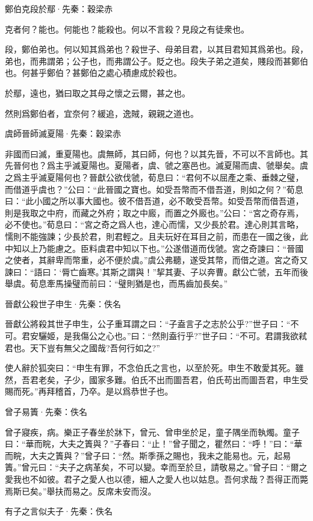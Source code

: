 \documentclass[12pt,a4paper]{ctexbook}
\begin{document}
鄭伯克段於鄢·先秦：穀梁赤 \par
克者何？能也。何能也？能殺也。何以不言殺？見段之有徒衆也。\par
段，鄭伯弟也。何以知其爲弟也？殺世子、母弟目君，以其目君知其爲弟也。段，弟也，而弗謂弟；公子也，而弗謂公子。貶之也。段失子弟之道矣，賤段而甚鄭伯也。何甚乎鄭伯？甚鄭伯之處心積慮成於殺也。\par
於鄢，遠也，猶曰取之其母之懷之云爾，甚之也。\par
然則爲鄭伯者，宜奈何？緩追，逸賊，親親之道也。\par
虞師晉師滅夏陽·先秦：穀梁赤 \par
非國而曰滅，重夏陽也。虞無師，其曰師，何也？以其先晉，不可以不言師也。其先晉何也？爲主乎滅夏陽也。夏陽者，虞、虢之塞邑也。滅夏陽而虞、虢舉矣。虞之爲主乎滅夏陽何也？晉獻公欲伐虢，荀息曰：“君何不以屈產之乘、垂棘之璧，而借道乎虞也？”公曰：“此晉國之寶也。如受吾幣而不借吾道，則如之何？”荀息曰：“此小國之所以事大國也。彼不借吾道，必不敢受吾幣。如受吾幣而借吾道，則是我取之中府，而藏之外府；取之中廄，而置之外廄也。”公曰：“宮之奇存焉，必不使也。”荀息曰：“宮之奇之爲人也，達心而懦，又少長於君。達心則其言略，懦則不能強諫；少長於君，則君輕之。且夫玩好在耳目之前，而患在一國之後，此中知以上乃能慮之。臣料虞君中知以下也。”公遂借道而伐虢。宮之奇諫曰：“晉國之使者，其辭卑而幣重，必不便於虞。”虞公弗聽，遂受其幣，而借之道。宮之奇又諫曰：“語曰：‘脣亡齒寒。’其斯之謂與！”挈其妻、子以奔曹。獻公亡虢，五年而後舉虞。荀息牽馬操璧而前曰：“璧則猶是也，而馬齒加長矣。”\par
晉獻公殺世子申生·先秦：佚名 \par
晉獻公將殺其世子申生，公子重耳謂之曰：“子盍言子之志於公乎?”世子曰：“不可。君安驪姬，是我傷公之心也。”曰：“然則盍行乎?”世子曰：“不可。君謂我欲弒君也。天下豈有無父之國哉?吾何行如之?”\par
使人辭於狐突曰：“申生有罪，不念伯氏之言也，以至於死。申生不敢愛其死。雖然，吾君老矣，子少，國家多難。伯氏不出而圖吾君，伯氏苟出而圖吾君，申生受賜而死。”再拜稽首，乃卒。是以爲恭世子也。\par
曾子易簀·先秦：佚名 \par
曾子寢疾，病。樂正子春坐於牀下，曾元、曾申坐於足，童子隅坐而執燭。童子曰：“華而睆，大夫之簀與？”子春曰：“止！”曾子聞之，瞿然曰：“呼！”曰：“華而睆，大夫之簀與？”曾子曰：“然。斯季孫之賜也，我未之能易也。元，起易簀。”曾元曰：“夫子之病革矣，不可以變。幸而至於旦，請敬易之。”曾子曰：“爾之愛我也不如彼。君子之愛人也以德，細人之愛人也以姑息。吾何求哉？吾得正而斃焉斯已矣。”舉扶而易之。反席未安而沒。\par
有子之言似夫子·先秦：佚名 \par
\end{document}
